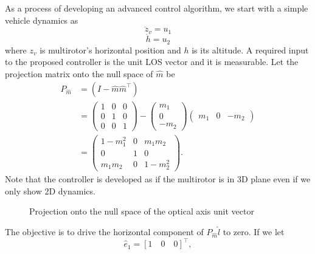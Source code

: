 As a process of developing an advanced control algorithm, we start with a simple vehicle dynamics as 
\begin{equation}
\ddot{z}_v=u_1
\end{equation}
\begin{equation}
\ddot{h}=u_2
\end{equation} where $z_v$ is multirotor's horizontal position and $h$ is its altitude.
A required input to the proposed controller is the unit LOS vector and it is measurable. 
Let the projection matrix onto the null space of $\hat{m}$ be 
\begin{align}
P_{\hat{m}}&=(I-\hat{m}\hat{m}^\top)
\\&=\begin{pmatrix}1 & 0 & 0 \\ 0 & 1 & 0 \\ 0 & 0 & 1 \end{pmatrix}
-\begin{pmatrix} m_1 \\ 0 \\ -m_2 \end{pmatrix}\begin{pmatrix} m_1 & 0 & -m_2 \end{pmatrix}
\\&=\begin{pmatrix}1-m_1^2 & 0 & m_1m_2 \\ 0 & 1 & 0 \\ m_1m_2 & 0 & 1-m_2^2 \end{pmatrix}.
\label{p_mhat}
\end{align}
Note that the controller is developed as if the multirotor is in 3D plane even if we only show 2D dynamics.
\begin{figure}[thpb]
	\centering
	\caption{Projection onto the null space of the optical axis unit vector}
	\label{projection}
\end{figure}
The objective is to drive the horizontal component of $P_{\hat{m}}\hat{l}$ to zero. If we let
\begin{equation}
\hat{e}_1=[1 \quad 0 \quad 0]^\top,
\label{e_1}
\end{equation}

